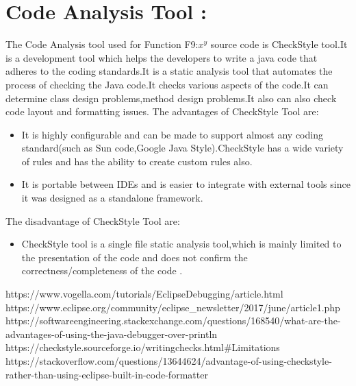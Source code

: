 \documentclass[10pt]{article}
\begin{document}
\section{Code Analysis Tool :}
The Code Analysis tool used for Function F9:$x^y$ source code is CheckStyle tool.It is a development tool which helps the developers to write a java code that adheres to the coding standards.It is a static analysis tool that automates the process of checking the Java code.It checks various aspects of the code.It can determine class design problems,method design problems.It also can also check code layout and formatting issues. 
The advantages of CheckStyle Tool are:
\begin{itemize}
  \item It is highly configurable and can be made to support almost any coding standard(such as Sun code,Google Java Style).CheckStyle has a wide variety of rules and has the ability to create custom rules also.
  \item It is portable between IDEs and is easier to integrate with external tools  since it was designed as a standalone framework.
\end{itemize}
The disadvantage of CheckStyle Tool are:
\begin{itemize}
  \item CheckStyle tool is a single file static analysis tool,which is mainly limited to the presentation of the code and does not confirm the correctness/completeness of the code .
\end{itemize}
\begin{thebibliography}{}
\bibitem{}https://www.vogella.com/tutorials/EclipseDebugging/article.html
\bibitem{}https://www.eclipse.org/community/eclipse\_newsletter/2017/june/article1.php
\bibitem{}https://softwareengineering.stackexchange.com/questions/168540/what-are-the-advantages-of-using-the-java-debugger-over-println
\bibitem{}https://checkstyle.sourceforge.io/writingchecks.html\#Limitations
\bibitem{}https://stackoverflow.com/questions/13644624/advantage-of-using-checkstyle-rather-than-using-eclipse-built-in-code-formatter


\end{thebibliography}
 
 
\end{document}
